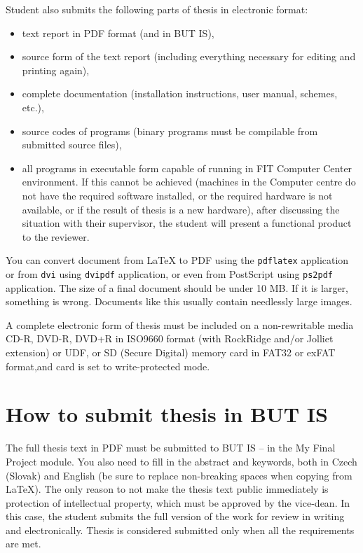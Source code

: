 Student also submits the following parts of thesis in electronic format:
\begin{itemize}
  \item{text report in PDF format (and in BUT IS),}
  \item{source form of the text report (including everything necessary for editing and printing again),}
  \item{complete documentation (installation instructions, user manual, schemes, etc.),}
  \item{source codes of programs (binary programs must be compilable from submitted source files),}
  \item{all programs in executable form capable of running in FIT Computer Center environment. If this cannot be achieved (machines in the Computer centre do not have the required software installed, or the required hardware is not available, or if the result of thesis is a new hardware), after discussing the situation with their supervisor, the student will present a functional product to the reviewer.}
\end{itemize}

You can convert document from LaTeX to PDF using the \texttt{pdflatex} application or from \texttt{dvi} using \texttt{dvipdf} application, or even from PostScript using \texttt{ps2pdf} application. The size of a final document should be under 10 MB. If it is larger, something is wrong. Documents like this usually contain needlessly large images.

A complete electronic form of thesis must be included on a non-rewritable media CD-R, DVD-R, DVD+R in ISO9660 format (with RockRidge and/or Jolliet extension) or UDF, or SD (Secure Digital) memory card in FAT32 or exFAT format,and card is set to write-protected mode.


\section{How to submit thesis in BUT IS}
The full thesis text in PDF must be submitted to BUT IS -- in the My Final Project module. You also need to fill in the abstract and keywords, both in Czech (Slovak) and English (be sure to replace non-breaking spaces when copying from \LaTeX{}). The only reason to not make the thesis text public immediately is protection of intellectual property, which must be approved by the vice-dean. In this case, the student submits the full version of the work for review in writing and electronically. Thesis is considered submitted only when all the requirements are met.

